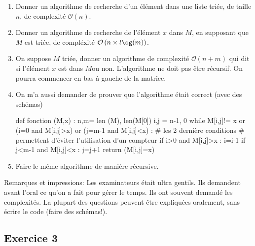 \documentclass[10pt,fleqn]{article} %
\begin{document}
\begin{multicols}{2}
\begin{enumerate}
\item Donner un algorithme de recherche d'un élément dans une liste triée, de taille $n$, de complexité $\mathcal{O}(n)$. 


\item Donner un algorithme de recherche de l'élément $x$ dans $M$, en supposant que $M$ est triée, de compléxité $\mathcal{O}\left(n\times l\og(m)\right)$.


\item On suppose $M$ triée, donner un algorithme de complexité $\mathcal{O}(n+m)$ qui dit si l'élément $x$ est dans $M $ou non. L'algorithme ne doit pas être récursif. On pourra commencer en bas à gauche de la matrice. %


\item On m'a aussi demander de prouver que l'algorithme était correct (avec des schémas)
\begin{python}
def fonction (M,x) :
	n,m= len (M), len(M[0])
	i,j = n-1, 0
	while M[i,j]!= x or  (i=0 and M[i,j]>x) 
	     or (j=m-1 and M[i,j]<x) : 
	     # les 2 dernière conditions
           # permettent d'éviter l'utilisation d'un compteur
		if i>0 and M[i,j]>x :
			i=i-1
		if j<m-1 and M[i,j]<x :
			j=j+1
	return (M[i,j]=x)
\end{python}





\item Faire le même algorithme de manière récursive.
\end{enumerate}

\begin{rem}
Remarques et impressions: Les examinateurs était ultra gentils.
Ils demandent avant l'oral ce qu'on a fait pour gérer le temps.
Ils ont souvent demandé les complexités.
La plupart des questions peuvent être expliquées oralement, sans écrire le code (faire des schémas!).
\end{rem}


\subsection*{Exercice 3}


\end{multicols}
\end{document}
